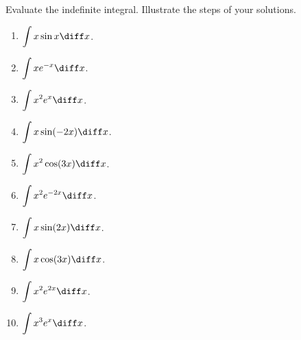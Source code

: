 Evaluate the indefinite integral. Illustrate the steps of your solutions.
\begin{multicols}{2}
\begin{enumerate}[ref={\fcProblemRef}]
\item \label{problemIntegratex*sin(x)dx} $\displaystyle \int x \sin x \diff x$.

\item $\displaystyle \int x e^{-x}\diff x$.

\item \label{problemIntegratex^2e^xdx} $\displaystyle \int x^2 e^x \diff x$.

\item $\displaystyle \int x\sin (-2x)\diff x$.

\item $\displaystyle \int x^2\cos (3x)\diff x$.

\item \label{problemintx^2e^(-2x)dx} $\displaystyle \int x^2 e^{-2x}\diff x$.

\item $\displaystyle \int x \sin (2x)\diff x$.

\item $\displaystyle \int x \cos (3x)\diff x$.

\item $\displaystyle \int x^2 e^{2x}\diff x$.

\item $\displaystyle \int x^3 e^x \diff x$.

\end{enumerate}
\end{multicols}